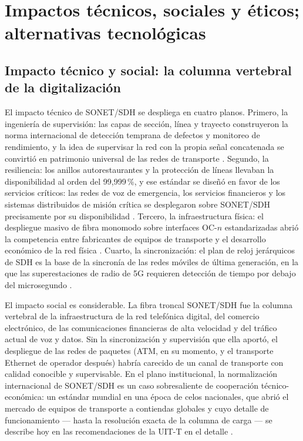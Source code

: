 \documentclass[12pt,a4paper]{article}
\begin{document}
\section{Impactos técnicos, sociales y éticos; alternativas tecnológicas}

\subsection{Impacto técnico y social: la columna vertebral de la digitalización}

El impacto técnico de SONET/SDH se despliega en cuatro planos. Primero, la ingeniería de supervisión: las capas de sección, línea y trayecto construyeron la norma internacional de detección temprana de defectos y monitoreo de rendimiento, y la idea de supervisar la red con la propia señal concatenada se convirtió en patrimonio universal de las redes de transporte \cite{ituG803, ituotn}. Segundo, la resiliencia: los anillos autorestaurantes y la protección de líneas llevaban la disponibilidad al orden del 99{,}999\,\%, y ese estándar se diseñó en favor de los servicios críticos: las redes de voz de emergencia, los servicios financieros y los sistemas distribuidos de misión crítica se desplegaron sobre SONET/SDH precisamente por su disponibilidad \cite{ansi, stallings2004}. Tercero, la infraestructura física: el despliegue masivo de fibra monomodo sobre interfaces OC-$n$ estandarizadas abrió la competencia entre fabricantes de equipos de transporte y el desarrollo económico de la red física \cite{stallings2004, tanenbaum2012}. Cuarto, la sincronización: el plan de reloj jerárquicos de SDH es la base de la sincronía de las redes móviles de última generación, en la que las superestaciones de radio de 5G requieren detección de tiempo por debajo del microsegundo \cite{ituG8261, ituG823}.

El impacto social es considerable. La fibra troncal SONET/SDH fue la columna vertebral de la infraestructura de la red telefónica digital, del comercio electrónico, de las comunicaciones financieras de alta velocidad y del tráfico actual de voz y datos. Sin la sincronización y supervisión que ella aportó, el despliegue de las redes de paquetes (ATM, en su momento, y el transporte Ethernet de operador después) habría carecido de un canal de transporte con calidad conocible y supervisable. En el plano institucional, la normalización internacional de SONET/SDH es un caso sobresaliente de cooperación técnico-económica: un estándar mundial en una época de celos nacionales, que abrió el mercado de equipos de transporte a contiendas globales y cuyo detalle de funcionamiento --- hasta la resolución exacta de la columna de carga --- se describe hoy en las recomendaciones de la UIT-T en el detalle \cite{itug707, ituG803}.
\end{document}
